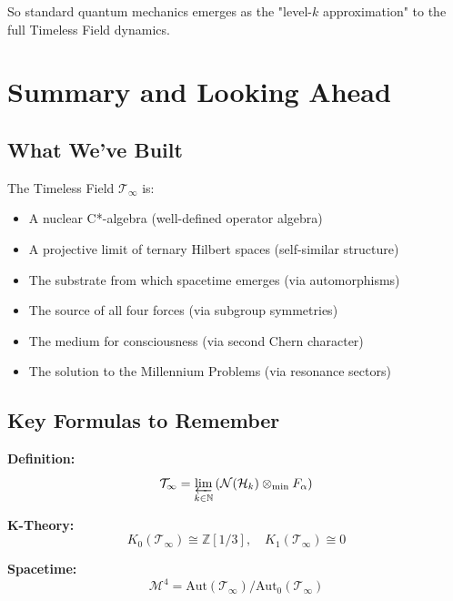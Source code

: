 \begin{defn}
So standard quantum mechanics emerges as the "level-$k$ approximation" to the full Timeless Field dynamics.

\section{Summary and Looking Ahead}
\label{sec:summary}

\subsection{What We've Built}

The Timeless Field $\mathcal{T}_\infty$ is:
\begin{itemize}
\item A nuclear C*-algebra (well-defined operator algebra)
\item A projective limit of ternary Hilbert spaces (self-similar structure)
\item The substrate from which spacetime emerges (via automorphisms)
\item The source of all four forces (via subgroup symmetries)
\item The medium for consciousness (via second Chern character)
\item The solution to the Millennium Problems (via resonance sectors)
\end{itemize}

\subsection{Key Formulas to Remember}

\begin{tcolorbox}[colback=yellow!10!white, colframe=orange!75!black, title=Essential Formulas]
\textbf{Definition:}
\begin{equation*}
\mathcal{T}_\infty = \varprojlim_{k \in \mathbb{N}} \left(\mathcal{N}(\mathcal{H}_k) \otimes_{\min} F_\alpha\right)
\end{equation*}

\textbf{K-Theory:}
\begin{equation*}
K_0(\mathcal{T}_\infty) \cong \mathbb{Z}[1/3], \quad K_1(\mathcal{T}_\infty) \cong 0
\end{equation*}

\textbf{Spacetime:}
\begin{equation*}
\mathcal{M}^4 = \text{Aut}(\mathcal{T}_\infty) / \text{Aut}_0(\mathcal{T}_\infty)
\end{equation*}


\end{tcolorbox}
\end{defn}
